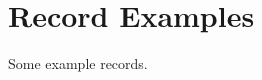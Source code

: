 \documentclass[10pt,twoside,a4paper,english]{article}
\begin{document}


\newpage





\section{Record Examples}

Some example records.
\end{document}

